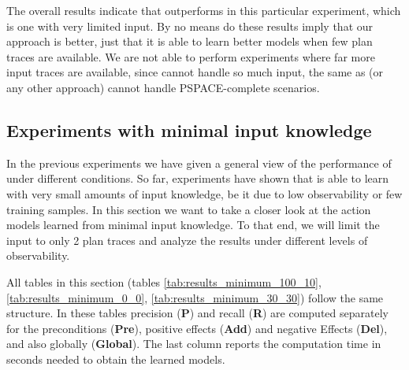
The overall results indicate that \FAMA outperforms \ARMS in this particular experiment, which is one with very limited input. By no means do these results imply that our approach is better, just that it is able to learn better models when few plan traces are available. We are not able to perform experiments where far more input traces are available, since \FAMA cannot handle so much input, the same as \ARMS (or any other approach) cannot handle PSPACE-complete scenarios.



\subsection{Experiments with minimal input knowledge}
\label{minimal}
In the previous experiments we have given a general view of the performance of \FAMA under different conditions. So far, experiments have shown that \FAMA is able to learn with very small amounts of input knowledge, be it due to low observability or few training samples. In this section we want to take a closer look at the action models learned from minimal input knowledge. To that end, we will limit the input to only 2 plan traces and analyze the results under different levels of observability.

All tables in this section (tables \ref{tab:results_minimum_100_10}, \ref{tab:results_minimum_0_0}, \ref{tab:results_minimum_30_30}) follow the same structure. In these tables precision ({\bf P}) and recall ({\bf R}) are computed separately for the preconditions ({\bf Pre}), positive effects ({\bf Add}) and negative Effects ({\bf Del}), and also globally ({\bf Global}). The last column reports the computation time in seconds needed to obtain the learned models.

